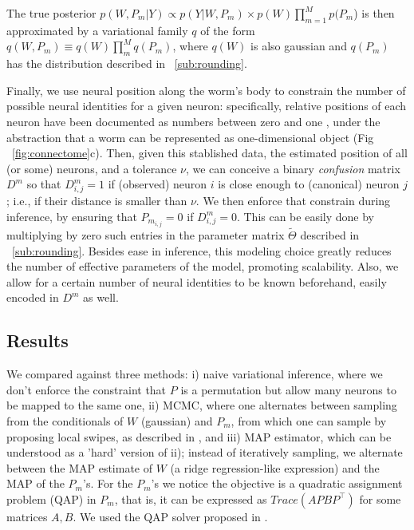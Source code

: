 \documentclass[twoside]{article}
\begin{document}
The true posterior $p(W,P_m|Y)\propto p(Y|W,P_m)\times p(W)\prod_{m=1}^M p(P_m$) is then approximated by a variational family $q$ of the form $q(W,P_m)\equiv q(W)\prod_m^M q(P_m)$, where $q(W)$ is also gaussian and $q(P_m)$ has the distribution described in ~\ref{sub:rounding}. 

Finally, we use neural position along the worm's body to constrain the number of possible neural identities for a given neuron: specifically, relative positions of each neuron have been documented as numbers between zero and one \cite{white1986structure,wormatlas} , under the abstraction that a worm can be represented as one-dimensional object (Fig ~\ref{fig:connectome}c). Then, given this stablished data, the estimated position of all (or some) neurons, and a tolerance $\nu$, we can conceive a binary \textit{confusion} matrix $D^m$ so that $D^m_{i,j}=1$ if (observed) neuron $i$ is close enough to (canonical) neuron $j$; i.e., if their distance is smaller than $\nu$. We then enforce that constrain during inference, by ensuring that $P_{m_{i,j}}=0$ if $D^m_{i,j}=0$. This can be easily done by multiplying by zero such entries in the parameter matrix $\widetilde{\Theta}$ described in ~\ref{sub:rounding}. Besides ease in inference,  this modeling choice greatly reduces the number of effective parameters of the model, promoting scalability. Also, we allow for a certain number of neural identities to be known beforehand, easily encoded in $D^m$ as well.

\subsection{Results}

We compared against three methods: i) naive variational inference, where we don't enforce the constraint that $P$ is a permutation but allow many neurons to be mapped to the same one, ii) MCMC, where one alternates between sampling from the conditionals of $W$ (gaussian) and $P_m$, from which one can sample by proposing local swipes, as described in \cite{Diaconis2009}, and iii) MAP estimator, which can be understood as a 'hard' version of ii); instead of iteratively sampling, we alternate between the MAP estimate of $W$ (a ridge regression-like expression) and the MAP of the $P_m$'s. For the $P_m$'s we notice the objective is a quadratic assignment problem (QAP) in $P_m$, that is, it can be expressed as $Trace(APBP^\top)$ for some matrices $A,B$. We used the QAP solver proposed in \cite{Vogelstein2015}. 
\end{document}
